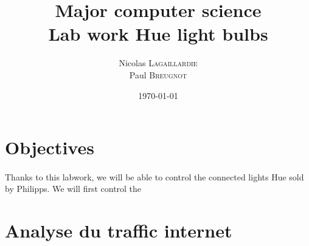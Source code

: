 \documentclass{article}
\title{Major computer science\\ Lab work Hue light bulbs} %
\author{Nicolas \textsc{Lagaillardie} \\ Paul \textsc{Breugnot}} %
\date{\today} %
\begin{document}
\maketitle %

\tableofcontents
\newpage




\section{Objectives}

\paragraph{}
Thanks to this labwork, we will be able to control the connected lights Hue \textcopyright sold by Philipps. We will first control the 
 

\section{Analyse du traffic internet}
\end{document}
